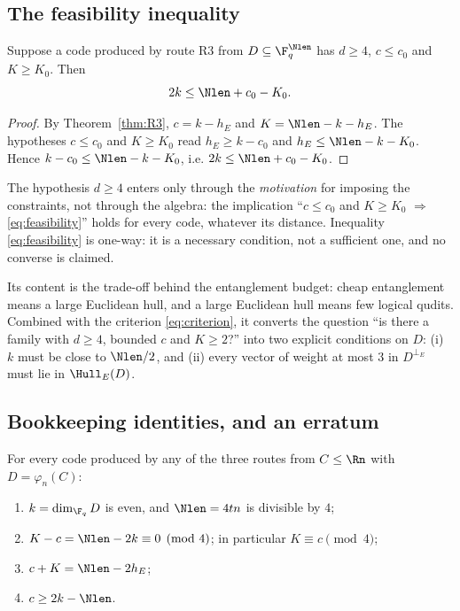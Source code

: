 \subsection{The feasibility inequality}

\begin{theorem}\label{thm:feasibility}
Suppose a code produced by route R3 from $D\subseteq\F_q^{\Nlen}$ has
$d\ge4$, $c\le c_0$ and $K\ge K_0$. Then
\begin{equation}\label{eq:feasibility}
  2k\le \Nlen+c_0-K_0 .
\end{equation}
\end{theorem}

\begin{proof}
By Theorem~\ref{thm:R3}, $c=k-h_E$ and $K=\Nlen-k-h_E$. The hypotheses
$c\le c_0$ and $K\ge K_0$ read $h_E\ge k-c_0$ and
$h_E\le \Nlen-k-K_0$. Hence $k-c_0\le \Nlen-k-K_0$, i.e.
$2k\le\Nlen+c_0-K_0$.
\end{proof}

\begin{remark}
The hypothesis $d\ge4$ enters only through the \emph{motivation} for imposing
the constraints, not through the algebra: the implication
``$c\le c_0$ and $K\ge K_0$ $\Rightarrow$ \eqref{eq:feasibility}'' holds for
every code, whatever its distance. Inequality \eqref{eq:feasibility} is one-way:
it is a necessary condition, not a sufficient one, and no converse is claimed.

Its content is the trade-off behind the entanglement budget: cheap entanglement
means a large Euclidean hull, and a large Euclidean hull means few logical
qudits. Combined with the criterion \eqref{eq:criterion}, it converts the
question ``is there a family with $d\ge4$, bounded $c$ and $K\ge2$?'' into two
explicit conditions on $D$: (i) $k$ must be close to $\Nlen/2$, and (ii) every
vector of weight at most $3$ in $D^{\perp_E}$ must lie in $\Hull_E(D)$.
\end{remark}

\subsection{Bookkeeping identities, and an erratum}

\begin{theorem}[bookkeeping]\label{thm:bookkeeping}
For every code produced by any of the three routes from $C\le\Rn$ with
$D=\varphi_n(C)$:
\begin{enumerate}[label=\textnormal{(\alph*)},leftmargin=*]
\item $k=\dim_{\F_q}D$ is even, and $\Nlen=4tn$ is divisible by $4$;
\item $K-c=\Nlen-2k\equiv0\pmod4$; in particular $K\equiv c\pmod4$;
\item $c+K=\Nlen-2h_E$;
\item $c\ge 2k-\Nlen$.
\end{enumerate}
\end{theorem}

